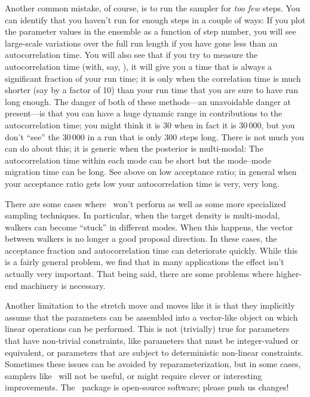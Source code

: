 Another common mistake, of course, is to run the sampler for \emph{too
  few} steps.  You can identify that you haven't run for enough steps
in a couple of ways: If you plot the parameter values in the ensemble
as a function of step number, you will see large-scale variations over
the full run length if you have gone less than an autocorrelation
time.  You will also see that if you try to measure the
autocorrelation time (with, say, \acor), it will give you a time that
is always a significant fraction of your run time; it is only when the
correlation time is much shorter (say by a factor of 10) than your run
time that you are sure to have run long enough.  The danger of both of
these methods---an unavoidable danger at present---is that you can
have a huge dynamic range in contributions to the autocorrelation
time; you might think it is 30 when in fact it is 30\,000, but you
don't ``see'' the 30\,000 in a run that is only 300 steps long.  There
is not much you can do about this; it is generic when the posterior is
multi-modal: The autocorrelation time within each mode can be short but
the mode--mode migration time can be long.  See above on low
acceptance ratio; in general when your acceptance ratio gets low your
autocorrelation time is very, very long.

There are some cases where \this\ won't perform as well as some
more specialized sampling techniques. In particular, when the target density
is multi-modal, walkers can become ``stuck'' in different modes. When
this happens, the vector between walkers is no longer a good proposal
direction. In these cases, the acceptance fraction and autocorrelation
time can deteriorate quickly. While this is a fairly general problem, we
find that in many applications the effect isn't actually very important.
That being said, there are some problems where higher-end machinery
\citep[such as ][]{Brewer:2011} is necessary.

Another limitation to the stretch move and moves like it is
that they implicitly assume that the parameters can be assembled into
a vector-like object on which linear operations can be performed.
This is not (trivially) true for parameters that have non-trivial
constraints, like parameters that must be integer-valued or
equivalent, or parameters that are subject to deterministic non-linear
constraints. Sometimes these issues can be avoided by
reparameterization, but in some cases, samplers like \this\ will not
be useful, or might require clever or interesting improvements. The
\this\ package is open-source software; please push us changes!

